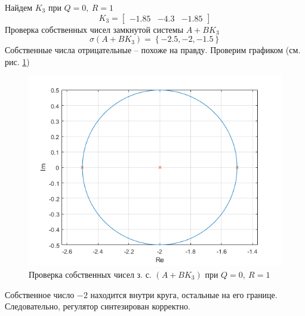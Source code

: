\documentclass[a4paper, 12pt]{article}
\begin{document}
    Найдем $K_3$ при $Q=0,\ R=1$
    $$
    K_3=\begin{bmatrix}
        -1.85 &-4.3 &-1.85
    \end{bmatrix}
    $$
    Проверка собственных чисел замкнутой системы $A+BK_3$
    $$
    \sigma\left( A+BK_3 \right)=\left\{ -2.5, -2, -1.5 \right\}
    $$
    Собственные числа отрицательные -- похоже на правду. Проверим графиком (см. рис. \ref{3task_eig_Q0_R1})
    \begin{figure}[H]
        \centering
        \includegraphics[scale=0.75]{3task_eig_Q0_R1.png}
        \captionsetup{skip=0pt}
        \caption{Проверка собственных чисел з. с. $\left(A+BK_3\right)$ при $Q=0,\ R=1$}
        \label{3task_eig_Q0_R1}
    \end{figure}
    \noindent Собственное число $-2$ находится внутри круга, остальные на его границе.
    Следовательно, регулятор синтезирован корректно.
\end{document}
